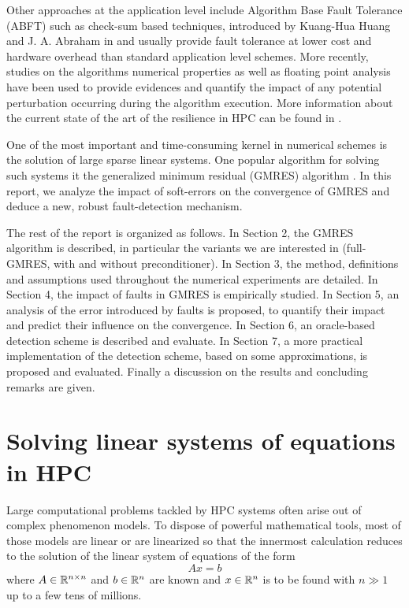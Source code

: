 \documentclass[twoside]{article}
\begin{document}
Other approaches at the application level include Algorithm Base Fault Tolerance (ABFT) such as check-sum based techniques, introduced by Kuang-Hua Huang and J. A. Abraham in \cite{checksum} and usually provide fault tolerance at lower cost and hardware overhead than standard application level schemes. More recently, studies on the algorithms numerical properties as well as floating point analysis have been used to provide evidences and quantify the impact of any potential perturbation occurring during the algorithm execution. More information about the current state of the art of the resilience in HPC can be found in \cite{Cappello:2014:TER:2983586.2983587}.

One of the most important and time-consuming kernel in numerical schemes is the solution of large sparse linear systems. One popular algorithm for solving such systems it the generalized minimum residual (GMRES) algorithm \cite{gmres}. 
In this report, we analyze the impact of soft-errors on the convergence of GMRES and deduce a new, robust fault-detection mechanism.

The rest of the report is organized as follows. In Section 2, the GMRES algorithm is described, in particular the variants we are interested in (full-GMRES, with and without preconditioner). In Section 3, the method, definitions and assumptions used throughout the numerical experiments are detailed. In Section 4, the impact of faults in GMRES is empirically studied. In Section 5, an analysis of the error introduced by faults is proposed, to quantify their impact and predict their influence on the convergence. In Section 6, an oracle-based detection scheme is described and evaluate. In Section 7, a more practical implementation of the detection scheme, based on some approximations, is proposed and evaluated. Finally a discussion on the results and concluding remarks are given.


\section{Solving linear systems of equations in HPC}
Large computational problems tackled by HPC systems often arise out of complex phenomenon models. To dispose of powerful mathematical tools, most of those models are linear or are linearized so that the innermost calculation reduces to the solution of the linear system of equations of the form
$$
A x = b
$$
where $A \in \Bbb{R}^{n\times n}$ and $b\in \Bbb{R}^n$ are known and $x \in \Bbb{R}^n$  is to be found with $n \gg 1$ up to a few tens of millions.
\end{document}
